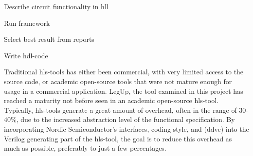 \begin{compactenum}
    \item Describe circuit functionality in \gls{hll}
    \item Run framework
    \item Select best result from reports
    \item Write \gls{hdl}-code
\end{compactenum}
Traditional \gls{hls}-tools has either been commercial, with very limited access to the source code, or academic open-source tools that were not mature enough for usage in a commercial application. LegUp, the tool examined in this project has reached a maturity not before seen in an academic open-source \gls{hls}-tool. Typically, \gls{hls}-tools generate a great amount of overhead, often in the range of 30-40\%,%
due to the increased abstraction level of the functional specification. By incorporating Nordic Semiconductor's interfaces, coding style, and (\gls{ddvc}) into the Verilog generating part of the \gls{hls}-tool, the goal is to reduce this overhead as much as possible, preferably to just a few percentages.


